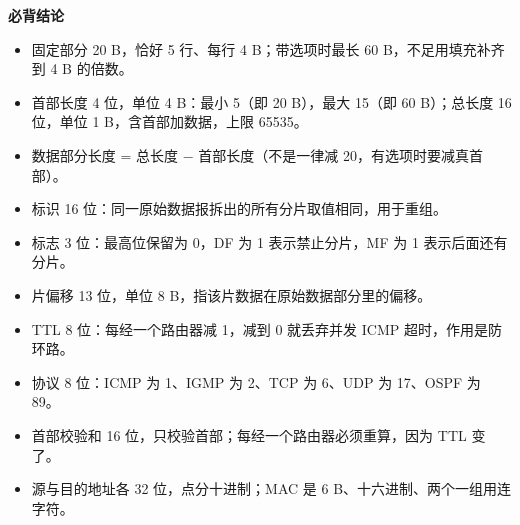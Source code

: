 \documentclass[10pt,a4paper]{ctexart}
\begin{document}




\textbf{必背结论}

\begin{itemize}

\item 固定部分 20 B，恰好 5 行、每行 4 B；带选项时最长 60 B，不足用填充补齐到 4 B 的倍数。

\item 首部长度 4 位，单位 4 B：最小 5（即 20 B），最大 15（即 60 B）；总长度 16 位，单位 1 B，含首部加数据，上限 65535。

\item 数据部分长度 = 总长度 − 首部长度（不是一律减 20，有选项时要减真首部）。

\item 标识 16 位：同一原始数据报拆出的所有分片取值相同，用于重组。

\item 标志 3 位：最高位保留为 0，DF 为 1 表示禁止分片，MF 为 1 表示后面还有分片。

\item 片偏移 13 位，单位 8 B，指该片数据在原始数据部分里的偏移。

\item TTL 8 位：每经一个路由器减 1，减到 0 就丢弃并发 ICMP 超时，作用是防环路。

\item 协议 8 位：ICMP 为 1、IGMP 为 2、TCP 为 6、UDP 为 17、OSPF 为 89。

\item 首部校验和 16 位，只校验首部；每经一个路由器必须重算，因为 TTL 变了。

\item 源与目的地址各 32 位，点分十进制；MAC 是 6 B、十六进制、两个一组用连字符。

\end{itemize}
\end{document}
